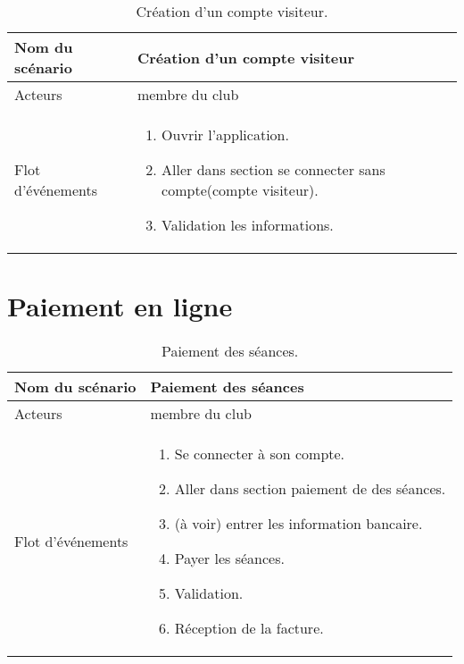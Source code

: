 \documentclass{report}
\begin{document}
\begin{table}[htbp]
\begin{center}
\begin{tabular}{|L{4cm}||L{10cm}|}
\hline Nom du scénario & Création d'un compte visiteur  \\
\hline  Acteurs &  membre du club \\
\hline  Flot d'événements &  \begin{enumerate}
\item Ouvrir l'application.
\item Aller dans section se connecter sans compte(compte visiteur).
\item Validation les informations.
\end{enumerate} \\
\hline
\end{tabular}
\caption{Création d'un compte visiteur.\label{creavisit}}
\end{center}
\end{table}

\section{Paiement en ligne}
\begin{table}[htbp]
\begin{center}
\begin{tabular}{|L{4cm}||L{10cm}|}
\hline Nom du scénario & Paiement des séances \\
\hline  Acteurs &  membre du club \\
\hline  Flot d'événements &  \begin{enumerate}
\item Se connecter à son compte.
\item Aller dans section paiement de des séances.
\item (à voir) entrer les information bancaire.
\item Payer les séances.
\item Validation.
\item Réception de la facture.
\end{enumerate} \\
\hline
\end{tabular}
\caption{Paiement des séances.\label{paiement}}
\end{center}
\end{table}
\end{document}
